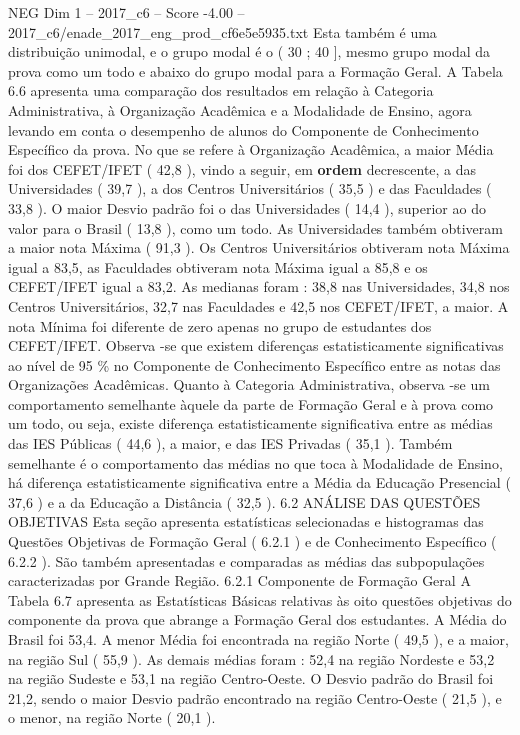 \begin{textsample}{NEG Dim 1 – 2017\_c6 – Score -4.00 – 2017\_c6/enade\_2017\_eng\_prod\_cf6e5e5935.txt}
Esta também é uma distribuição unimodal, e o grupo modal é o ( 30 ; 40 ], mesmo grupo modal da prova como um todo e abaixo do grupo modal para a Formação Geral.
A Tabela 6.6 apresenta uma comparação dos resultados em relação à Categoria Administrativa, à Organização Acadêmica e a Modalidade de Ensino, agora levando em conta o desempenho de alunos do Componente de Conhecimento Específico da prova.
No que se refere à Organização Acadêmica, a maior Média foi dos CEFET/IFET ( 42,8 ), vindo a seguir, em \textbf{ordem} decrescente, a das Universidades ( 39,7 ), a dos Centros Universitários ( 35,5 ) e das Faculdades ( 33,8 ).
O maior Desvio padrão foi o das Universidades ( 14,4 ), superior ao do valor para o Brasil ( 13,8 ), como um todo.
As Universidades também obtiveram a maior nota Máxima ( 91,3 ).
Os Centros Universitários obtiveram nota Máxima igual a 83,5, as Faculdades obtiveram nota Máxima igual a 85,8 e os CEFET/IFET igual a 83,2.
As medianas foram : 38,8 nas Universidades, 34,8 nos Centros Universitários, 32,7 nas Faculdades e 42,5 nos CEFET/IFET, a maior.
A nota Mínima foi diferente de zero apenas no grupo de estudantes dos CEFET/IFET.
Observa -se que existem diferenças estatisticamente significativas ao nível de 95 \% no Componente de Conhecimento Específico entre as notas das Organizações Acadêmicas.
Quanto à Categoria Administrativa, observa -se um comportamento semelhante àquele da parte de Formação Geral e à prova como um todo, ou seja, existe diferença estatisticamente significativa entre as médias das IES Públicas ( 44,6 ), a maior, e das IES Privadas ( 35,1 ).
Também semelhante é o comportamento das médias no que toca à Modalidade de Ensino, há diferença estatisticamente significativa entre a Média da Educação Presencial ( 37,6 ) e a da Educação a Distância ( 32,5 ). 6.2 ANÁLISE DAS QUESTÕES OBJETIVAS Esta seção apresenta estatísticas selecionadas e histogramas das Questões Objetivas de Formação Geral ( 6.2.1 ) e de Conhecimento Específico ( 6.2.2 ).
São também apresentadas e comparadas as médias das subpopulações caracterizadas por Grande Região. 6.2.1 Componente de Formação Geral A Tabela 6.7 apresenta as Estatísticas Básicas relativas às oito questões objetivas do componente da prova que abrange a Formação Geral dos estudantes.
A Média do Brasil foi 53,4.
A menor Média foi encontrada na região Norte ( 49,5 ), e a maior, na região Sul ( 55,9 ).
As demais médias foram : 52,4 na região Nordeste e 53,2 na região Sudeste e 53,1 na região Centro-Oeste.
O Desvio padrão do Brasil foi 21,2, sendo o maior Desvio padrão encontrado na região Centro-Oeste ( 21,5 ), e o menor, na região Norte ( 20,1 ).

\end{textsample}
